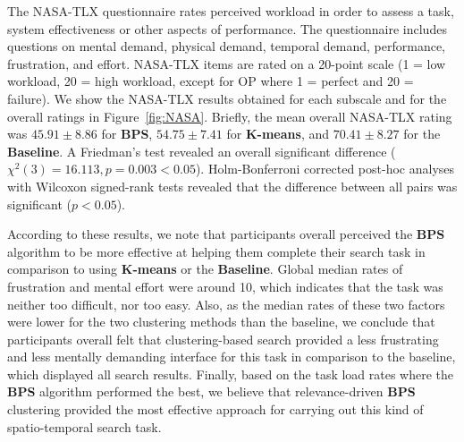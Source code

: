 The NASA-TLX questionnaire rates perceived workload in order to assess a task, system effectiveness or other aspects of performance.
The questionnaire includes questions on mental demand, physical demand, temporal demand, performance, frustration, and effort. NASA-TLX items are rated on a 20-point scale (1 = low workload, 20 = high workload, except for OP where 1 = perfect and 20 = failure). 
We show the NASA-TLX results obtained  for each subscale and for the overall ratings  in Figure~\ref{fig:NASA}.
Briefly, the mean overall NASA-TLX rating was $45.91\pm 8.86$ for {\bf BPS}, $54.75\pm 7.41$ for {\bf $\mathbf{K}$-means}, and $70.41\pm 8.27$ for the {\bf Baseline}. 
A Friedman's test revealed an overall significant difference ($\chi^2(3)= 16.113, p=0.003 < 0.05$).
Holm-Bonferroni corrected post-hoc analyses with Wilcoxon signed-rank tests 
revealed that the difference between all pairs was significant ($p < 0.05$). %


According to these results, we note that participants overall perceived the {\bf BPS} algorithm to be more effective at helping them complete their search task in comparison to using {\bf $\mathbf{K}$-means} or the {\bf Baseline}.  Global median rates of frustration and mental effort were around 10, which indicates that the task was neither too difficult, nor too easy.  Also, as the median rates of these two factors were lower for the two clustering methods than the baseline, we conclude that participants overall felt that clustering-based search provided a less frustrating and less mentally demanding interface for this task in comparison to the baseline, which displayed all search results. 
Finally, based on the task load rates where the {\bf BPS} algorithm performed the best, we believe that relevance-driven {\bf BPS} clustering provided the most effective approach for carrying out this kind of spatio-temporal search task.


